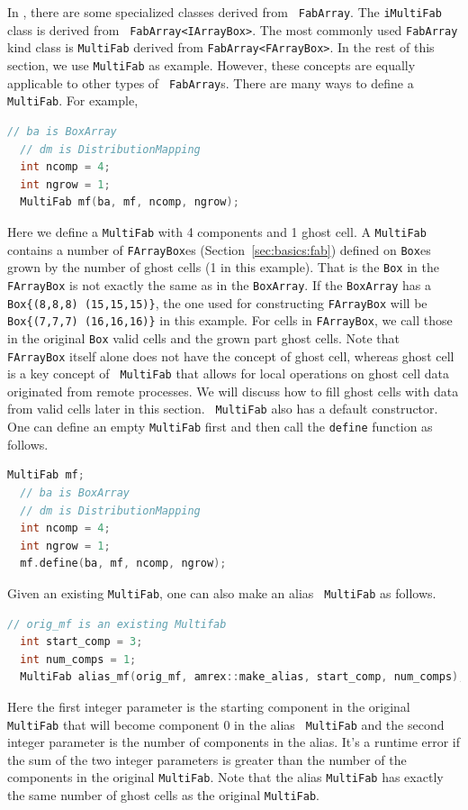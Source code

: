 {{{In \amrex, there are some specialized classes derived from {\tt
  FabArray}.  The {\tt iMultiFab} class is derived from {\tt
  FabArray<IArrayBox>}.  The most commonly used {\tt FabArray} kind
class is {\tt MultiFab} derived from {\tt FabArray<FArrayBox>}.  In
the rest of this section, we use {\tt MultiFab} as example.  However,
these concepts are equally applicable to other types of {\tt
  FabArray}s.  There are many ways to define a {\tt MultiFab}.  For
example,
\begin{lstlisting}[language=cpp]
  // ba is BoxArray
  // dm is DistributionMapping
  int ncomp = 4;
  int ngrow = 1;
  MultiFab mf(ba, mf, ncomp, ngrow);
\end{lstlisting}
Here we define a {\tt MultiFab} with 4 components and 1 ghost cell.  A
{\tt MultiFab} contains a number of {\tt FArrayBox}es
(Section~\ref{sec:basics:fab}) defined on {\tt Box}es grown by the
number of ghost cells (1 in this example).  That is the {\tt Box} in
the {\tt FArrayBox} is not exactly the same as in the {\tt BoxArray}.
If the {\tt BoxArray} has a {\tt Box\{(8,8,8) (15,15,15)\}}, the one
used for constructing {\tt FArrayBox} will be {\tt Box\{(7,7,7)
  (16,16,16)\}} in this example.  For cells in {\tt FArrayBox}, we
call those in the original {\tt Box} valid cells and the grown part
ghost cells.  Note that {\tt FArrayBox} itself alone does not have the
concept of ghost cell, whereas ghost cell is a key concept of {\tt
  MultiFab} that allows for local operations on ghost cell data
originated from remote processes.  We will discuss how to fill ghost
cells with data from valid cells later in this section.  {\tt
  MultiFab} also has a default constructor.  One can define an empty
{\tt MultiFab} first and then call the {\tt define} function as
follows.
\begin{lstlisting}[language=cpp]
  MultiFab mf;
  // ba is BoxArray
  // dm is DistributionMapping
  int ncomp = 4;
  int ngrow = 1;
  mf.define(ba, mf, ncomp, ngrow);
\end{lstlisting}
Given an existing {\tt MultiFab}, one can also make an alias {\tt
  MultiFab} as follows.
\begin{lstlisting}[language=cpp]
  // orig_mf is an existing Multifab
  int start_comp = 3;
  int num_comps = 1;
  MultiFab alias_mf(orig_mf, amrex::make_alias, start_comp, num_comps);
\end{lstlisting}
Here the first integer parameter is the starting component in the
original {\tt MultiFab} that will become component 0 in the alias {\tt
  MultiFab} and the second integer parameter is the number of
components in the alias.  It's a runtime error if the sum of the two
integer parameters is greater than the number of the components in the
original {\tt MultiFab}.  Note that the alias {\tt MultiFab} has
exactly the same number of ghost cells as the original {\tt MultiFab}.

}}}
